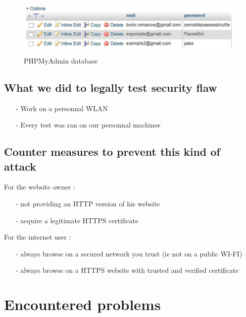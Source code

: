 \documentclass[a4paper, 11pt, oneside]{article}
\begin{document}
\begin{figure}[!h]
	\centering
	\includegraphics[scale=0.5]{../images/database.eps}
	\caption{PHPMyAdmin database}
	\label{database}
\end{figure}

\subsection{What we did to legally test security flaw}
\begin{itemize}
    \item[-] Work on a personnal WLAN\\
    \item[-] Every test was ran on our personnal machines\\
\end{itemize}

\subsection{Counter measures to prevent this kind of attack}
For the website owner : \\
\begin{itemize}
    \item[-] not providing an HTTP version of his website\\
    \item[-] acquire a legitimate HTTPS certificate\\
\end{itemize}

For the internet user : \\
\begin{itemize}
    \item[-] always browse on a secured network you trust (ie not on a public WI-FI)\\
    \item[-] always browse on a HTTPS website with trusted and verified certificate\\
\end{itemize}

\pagebreak

\section{Encountered problems}
\end{document}
